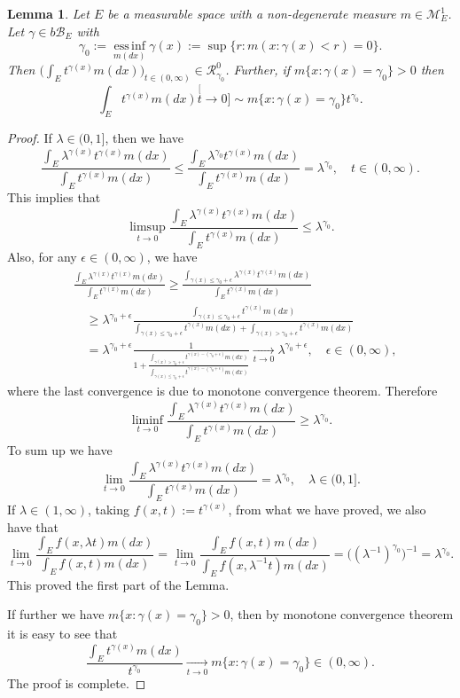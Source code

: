 \documentclass[12pt, a4paper]{amsart}
\newtheorem{lem}[thm]{Lemma}
\theoremstyle{definition}
\numberwithin{equation}{section}
\begin{document}
\begin{lem}\label{lem:regularly_variation_and_integration}
	Let $E$ be a measurable space with a non-degenerate measure $m \in \mathcal M^1_E$.
	Let $ \gamma \in b\mathscr B_E$ with 
\[
	\gamma_0 
	:= \operatorname*{ess\,inf}_{m(dx)} \gamma(x) 
	:= \sup\{r:m(x:\gamma(x) < r) = 0\}.
\]
	Then $\big(\int_E t^{\gamma(x)} m(dx)\big)_{t\in (0,\infty)} \in \mathcal R^0_{\gamma_0}$.
	Further, if $m\{x:\gamma(x) = \gamma_0\}>0$ then
\[
	\int_E t^{\gamma(x)} m(dx)
	\stackrel[t\to 0]{}{\sim}  m\{x:\gamma(x) = \gamma_0\} t^{\gamma_0}.
\]
	
\end{lem}

\begin{proof}
	If $\lambda \in (0,1]$, then we have
\[
	\frac{\int_E \lambda^{\gamma(x)} t^{\gamma(x)} m(dx)}{\int_E t^{\gamma(x)} m(dx)} 
	\leq \frac{\int_E \lambda^{\gamma_0} t^{\gamma(x)} m(dx)}{\int_E t^{\gamma(x)} m(dx)}
	= \lambda^{\gamma_0}, 
	\quad t\in (0,\infty).
\]
	This implies that
\[
	\limsup_{t\to 0}\frac{\int_E \lambda^{\gamma(x)} t^{\gamma(x)} m(dx)}{\int_E t^{\gamma(x)} m(dx)} 
	\leq \lambda ^{\gamma_0}.
\]
	Also, for any $\epsilon \in (0,\infty)$, we have
\[\begin{split}
	&\frac{\int_E \lambda^{\gamma(x)} t^{\gamma(x)} m(dx)}{\int_E t^{\gamma(x)} m(dx)} 
	\geq \frac{ \int_{ \gamma(x) \leq  \gamma_0 + \epsilon } \lambda^{ \gamma(x) } t^{ \gamma(x)} m(dx) } { \int_E t^{ \gamma(x) } m(dx) }
	\\&\quad \geq \lambda^{ \gamma_0 + \epsilon} \frac{ \int_{ \gamma(x) \leq \gamma_0 + \epsilon } t^{ \gamma(x)} m(dx) } { \int_{ \gamma(x) \leq \gamma_0 + \epsilon}t^{\gamma(x)}m(dx)+ \int_{\gamma(x) > \gamma_0 + \epsilon} t^{\gamma(x)}m(dx)} 
	\\&\quad = \lambda^{\gamma_0 + \epsilon} \frac{1}{1+ \frac{\int_{\gamma(x) > \gamma_0 + \epsilon}t^{\gamma(x) - (\gamma_0 + \epsilon)}m(dx)}{\int_{\gamma(x) \leq \gamma_0 + \epsilon}t^{\gamma(x)- (\gamma_0 + \epsilon)}m(dx)}} 
	\xrightarrow[t\to 0]{} \lambda ^{\gamma_0 + \epsilon},
	\quad \epsilon\in (0, \infty),
\end{split}\]
	where the last convergence is due to monotone convergence theorem.
	Therefore 
\[
	\liminf_{t\to 0}\frac{\int_E \lambda^{\gamma(x)} t^{\gamma(x)} m(dx)}{\int_E t^{\gamma(x)} m(dx)} 
	\geq \lambda ^{\gamma_0}.
\]
	To sum up we have
\[
	\lim_{t\to 0}\frac{\int_E \lambda^{\gamma(x)} t^{\gamma(x)} m(dx)}{\int_E t^{\gamma(x)} m(dx)} 
	= \lambda ^{\gamma_0},	
	\quad \lambda \in (0,1].
\]
	If $\lambda \in (1,\infty)$, taking $f(x, t):= t^{\gamma(x)}$, from what we have proved, we also have that
\[
	\lim_{t\to 0}\frac{\int_E f(x,\lambda t)m(dx)}{\int_E f(x, t)m(dx)} 
	= \lim_{t\to 0}\frac{\int_E f(x,t)m(dx)}{\int_E f(x, \lambda^{-1} t)m(dx)} 
	= \big((\lambda^{-1})^{\gamma_0} \big)^{-1}
	= \lambda ^{\gamma_0}.
\]
	This proved the first part of the Lemma.
	
	If further we have $m\{x:\gamma(x) = \gamma_0\}>0$, then by monotone convergence theorem  it is easy to see that
\[
	\frac{\int_E t^{\gamma(x)} m(dx)}{t^{\gamma_0}}
	\xrightarrow[t\to 0]{} m\{x:\gamma(x) = \gamma_0\}\in (0,\infty) .
\]
	The proof is complete.
	
\end{proof}
\end{document}

